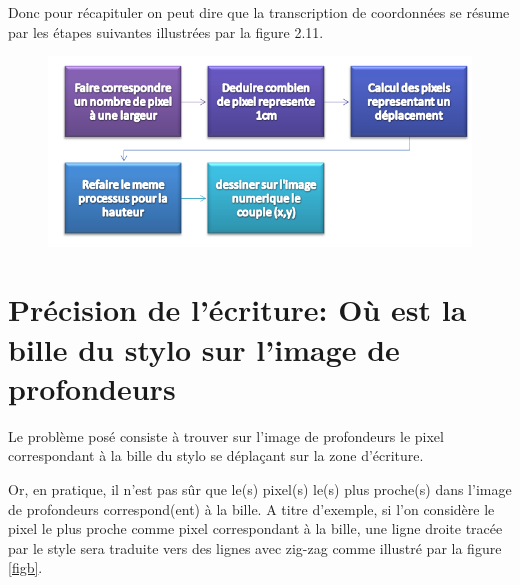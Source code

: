 \documentclass[12pt,a4paper,oneside]{book}
\begin{document}
	Donc pour récapituler on peut dire que la transcription de coordonnées se résume par les étapes suivantes illustrées par la figure 2.11.
	
	\begin{figure}[H]
		\centering
		\includegraphics[scale=0.69]{images/s3.png}
		\label{fig100}
	\end{figure}
	
	
	\section{Précision de l'écriture: Où est la bille du stylo sur l'image de profondeurs}	
	
	Le problème posé consiste à trouver sur l'image de profondeurs le pixel correspondant à la bille du stylo se déplaçant sur la zone d'écriture.
	
	Or, en pratique, il n'est pas sûr que le(s) pixel(s) le(s) plus proche(s) dans l'image de profondeurs correspond(ent) à la bille.
	A titre d'exemple, si l'on considère le pixel le plus proche comme pixel correspondant à la bille, une ligne droite tracée par le style sera traduite vers des lignes avec zig-zag comme illustré par la figure \ref{figb}.
	
\end{document}
